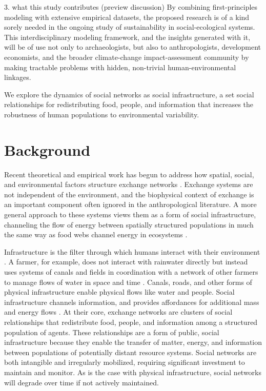 \documentclass[fleqn,10pt]{wlscirep}
\begin{document}
3. what this study contributes (preview discussion)
By combining first-principles modeling with extensive empirical datasets, the proposed research is of a kind sorely needed in the ongoing study of sustainability in social-ecological systems. This interdisciplinary modeling framework, and the insights generated with it, will be of use not only to archaeologists, but also to anthropologists, development economists, and the broader climate-change impact-assessment community by making tractable problems with hidden, non-trivial human-environmental linkages.

We explore the dynamics of social networks as social infrastructure, a set social relationships for redistributing food, people, and information that increases the robustness of human populations to environmental variability.

\section*{Background}
Recent theoretical and empirical work has begun to address how spatial, social, and environmental factors structure exchange networks \cite{Nolin2010Food-SharingIndonesia,Koster2014,Hao2015,Schnegg2015}. Exchange systems are not independent of the environment, and the biophysical context of exchange is an important component often ignored in the anthropological literature. A more general approach to these systems views them as a form of social infrastructure, channeling the flow of energy between spatially structured populations in much the same way as food webs channel energy in ecosystems \cite{Crabtree2015,Crabtree2017ReconstructingStates}.

Infrastructure is the filter through which humans interact with their environment \cite{Anderies2015}. A farmer, for example, does not interact with rainwater directly but instead uses systems of canals and fields in coordination with a network of other farmers to manage flows of water in space and time \cite{Yu2015}. Canals, roads, and other forms of physical infrastructure enable physical flows like water and people. Social infrastructure channels information, and provides affordances for additional mass and energy flows \cite{Anderies2015}. At their core, exchange networks are clusters of social relationships that redistribute food, people, and information among a structured population of agents. These relationships are a form of public, social infrastructure because they enable the transfer of matter, energy, and information between populations of potentially distant resource systems. Social networks are both intangible and irregularly mobilized, requiring significant investment to maintain and monitor. As is the case with physical infrastructure, social networks will degrade over time if not actively maintained.
\end{document}
